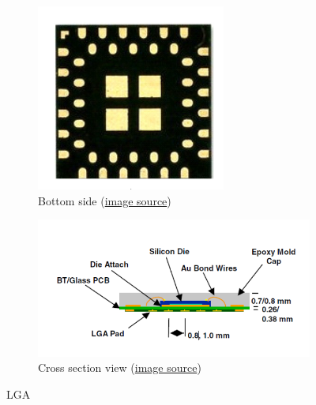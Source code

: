 \documentclass[final]{cubedoc}
\begin{document}
	
	\begin{figure}[h!]
		\centering
		\begin{subfigure}{.3\textwidth}
			\centering
			\includegraphics[keepaspectratio, height=.4\textheight, width=\textwidth]{docs/lga.png}
			\caption{Bottom side \small{(\href{https://web.archive.org/web/20200818134018/https://www.nxp.com/docs/en/application-note/AN2265.pdf}{image source})}}
			\label{fig:sub1}
		\end{subfigure}%
		\begin{subfigure}{.6\textwidth}
			\centering
			\includegraphics[keepaspectratio, width=\textwidth, height=.6\textheight]{docs/lga_cross.png}
			\caption{Cross section view \small{(\href{https://web.archive.org/web/20200818134018/https://www.nxp.com/docs/en/application-note/AN2265.pdf}{image source})}}
			\label{fig:sub2}
		\end{subfigure}
		\caption{LGA}
		\label{fig:test}
	\end{figure}
	
\end{document}

